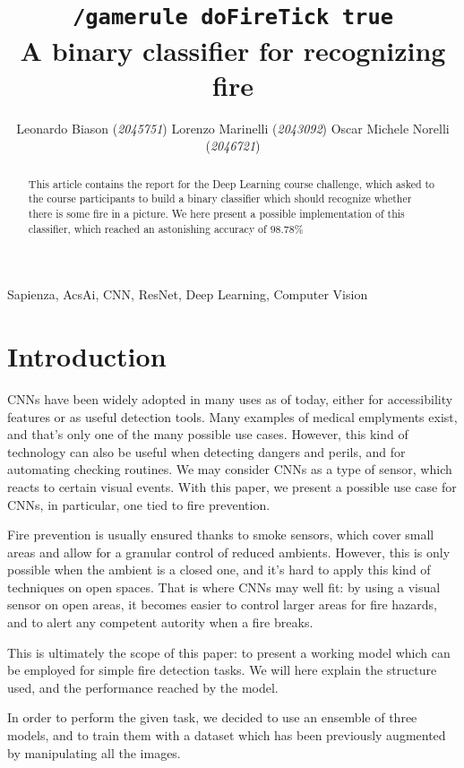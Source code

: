 \documentclass[11pt, journal]{IEEEtran}
\title{\texttt{/gamerule doFireTick true}\\A binary classifier for recognizing fire}
\author{Leonardo Biason (\textit{2045751}) \quad Lorenzo Marinelli (\textit{2043092}) \quad Oscar Michele Norelli (\textit{2046721})}
\newcommand{\nl}{

\medskip

}
\newcommand{\nl}{

\medskip

}
\begin{document}
\maketitle

\begin{abstract}
    This article contains the report for the Deep Learning course challenge, which asked to the course participants to build a binary classifier which should recognize whether there is some fire in a picture. We here present a possible implementation of this classifier, which reached an astonishing accuracy of $\mathbf{98.78\%}$
\end{abstract}

\begin{keywords}
    Sapienza, AcsAi, CNN, ResNet, Deep Learning, Computer Vision 
\end{keywords}

\section{Introduction}

CNNs have been widely adopted in many uses as of today, either for accessibility features or as useful detection tools. Many examples of medical emplyments exist, and that's only one of the many possible use cases. However, this kind of technology can also be useful when detecting dangers and perils, and for automating checking routines. We may consider CNNs as a type of sensor, which reacts to certain visual events. With this paper, we present a possible use case for CNNs, in particular, one tied to fire prevention.
\nl
\indent Fire prevention is usually ensured thanks to smoke sensors, which cover small areas and allow for a granular control of reduced ambients. However, this is only possible when the ambient is a closed one, and it's hard to apply this kind of techniques on open spaces. That is where CNNs may well fit: by using a visual sensor on open areas, it becomes easier to control larger areas for fire hazards, and to alert any competent autority when a fire breaks.
\nl
\indent This is ultimately the scope of this paper: to present a working model which can be employed for simple fire detection tasks. We will here explain the structure used, and the performance reached by the model.

In order to perform the given task, we decided to use an ensemble of three models, and to train them with a dataset which has been previously augmented by manipulating all the images.
\end{document}
